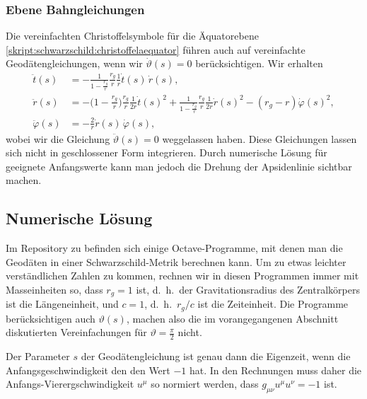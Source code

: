 \subsubsection{Ebene Bahngleichungen}
Die vereinfachten Christoffelsymbole für die Äquatorebene
\eqref{skript:schwarzschild:christoffelaequator}
führen auch auf vereinfachte Geodätengleichungen, wenn wir $\dot\vartheta(s)=0$
berücksichtigen.
Wir erhalten
\begin{align*}
\ddot t(s)
&=
-\frac{1}{1-\displaystyle\frac{r_g}{r}}\frac{r_g}{r}\frac{1}{r}\dot t(s)\,\dot r(s),
\\
\ddot r(s)
&=
-\biggl(1-\frac{r_g}{r}\biggr)\frac{r_g}{r}\frac1{2r}\dot t(s)^2
+\frac{1}{1-\displaystyle\frac{r_g}{r}} \frac{r_g}{r}\frac1{2r}\dot r(s)^2
- (r_g-r) \dot\varphi(s)^2,
\\
\ddot \varphi(s)
&=
-\frac2r \dot r(s)\,\dot\varphi(s),
\end{align*}
wobei wir die Gleichung $\ddot\vartheta(s) = 0$ weggelassen haben.
Diese Gleichungen lassen sich nicht in geschlossener Form integrieren.
Durch numerische Lösung für geeignete Anfangswerte kann man jedoch die
Drehung der Apsidenlinie sichtbar machen.

\subsection{Numerische Lösung}
Im Repository zu befinden sich einige Octave-Programme, mit denen man
die Geodäten in einer Schwarzschild-Metrik berechnen kann.
Um zu etwas leichter verständlichen Zahlen zu kommen, rechnen wir
in diesen Programmen immer mit Masseinheiten so, dass $r_g=1$ ist,
d.~h.~der Gravitationsradius des Zentralkörpers ist die Längeneinheit,
und $c=1$, d.~h.~$r_g/c$ ist die Zeiteinheit.
Die Programme berücksichtigen auch $\vartheta(s)$, machen also die 
im vorangegangenen Abschnitt diskutierten Vereinfachungen für
$\vartheta=\frac{\pi}2$ nicht.

Der Parameter $s$ der Geodätengleichung ist genau dann die Eigenzeit,
wenn die Anfangsgeschwindigkeit den den Wert $-1$ hat.
In den Rechnungen muss daher die Anfangs-Vierergschwindigkeit $u^\mu$
so normiert werden, dass $g_{\mu\nu}u^\mu u^\nu=-1$ ist.

